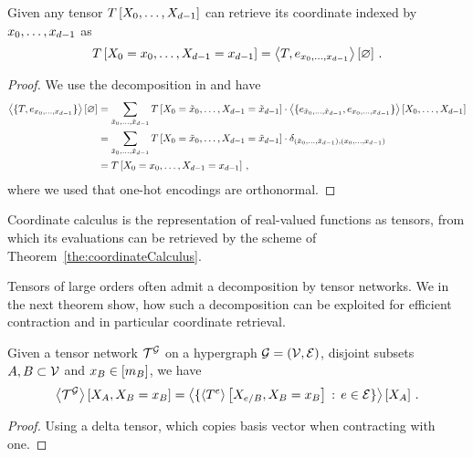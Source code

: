 \begin{theorem}\label{the:coordinateCalculus}
	Given any tensor $T\left[X_{0},\ldots,X_{d-1}\right]$ can retrieve its coordinate indexed by $x_{0},\ldots,x_{d-1}$ as
		\[ T\left[X_{0}=x_{0},\ldots,X_{d-1}=x_{d-1}\right] = \left\langle T, e_{x_{0},\ldots,x_{d-1}}\right\rangle \left[ \varnothing \right] \, . \]
\end{theorem}
\begin{proof}
	We use the decomposition in  and have
	\begin{align*}
		\left\langle \{T, e_{x_{0},\ldots,x_{d-1}}\}\right\rangle \left[ \varnothing \right] 
		& = \sum_{\tilde{x}_{0},\ldots,\tilde{x}_{d-1}} T\left[X_{0}=\tilde{x}_0,\ldots,X_{d-1}=\tilde{x}_{d-1}\right] \cdot \left\langle \{e_{\tilde{x}_{0},\ldots,\tilde{x}_{d-1}} ,e_{x_{0},\ldots,x_{d-1}} \}\right\rangle \left[ X_{0},\ldots,X_{d-1} \right] \\
		& =  \sum_{\tilde{x}_{0},\ldots,\tilde{x}_{d-1}} T\left[X_{0}=\tilde{x}_0,\ldots,X_{d-1}=\tilde{x}_{d-1}\right] \cdot \delta_{(\tilde{x}_{0},\ldots,\tilde{x}_{d-1}),(x_{0},\ldots,x_{d-1})} \\
		& = T\left[X_{0}=x_{0},\ldots,X_{d-1}=x_{d-1}\right] \, ,
	\end{align*}
	where we used that one-hot encodings are orthonormal.
\end{proof}

Coordinate calculus is the representation of real-valued functions as tensors, from which its evaluations can be retrieved by the scheme of Theorem~\ref{the:coordinateCalculus}.




Tensors of large orders often admit a decomposition by tensor networks.
We in the next theorem show, how such a decomposition can be exploited for efficient contraction and in particular coordinate retrieval.


\begin{theorem}\label{the:slicedContractionToCores}
	Given a tensor network $\mathcal{T}^{\mathcal{G}}$ on a hypergraph $\mathcal{G}=(\mathcal{V},\mathcal{E})$, disjoint subsets $A,B\subset\mathcal{V}$ and $x_{B}\in[m_{B}]$, we have
		\[ \left\langle \mathcal{T}^{\mathcal{G}}\right\rangle \left[ X_{A},X_{B}=x_{B} \right] 
		=  \left\langle \{
			\left\langle T^{e}\right\rangle \left[ X_{e/B},X_{B}=x_{B} \right] \, : \, e\in\mathcal{E}
		\}\right\rangle \left[ X_{A} \right] \, .
		\]
\end{theorem}
\begin{proof}
	Using a delta tensor, which copies basis vector when contracting with one.
\end{proof}

